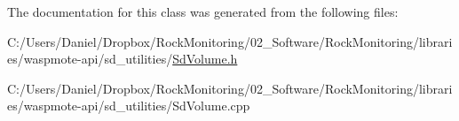 The documentation for this class was generated from the following files\+:\begin{DoxyCompactItemize}
\item 
C\+:/\+Users/\+Daniel/\+Dropbox/\+Rock\+Monitoring/02\+\_\+\+Software/\+Rock\+Monitoring/libraries/waspmote-\/api/sd\+\_\+utilities/\hyperlink{_sd_volume_8h}{Sd\+Volume.\+h}\item 
C\+:/\+Users/\+Daniel/\+Dropbox/\+Rock\+Monitoring/02\+\_\+\+Software/\+Rock\+Monitoring/libraries/waspmote-\/api/sd\+\_\+utilities/Sd\+Volume.\+cpp\end{DoxyCompactItemize}
